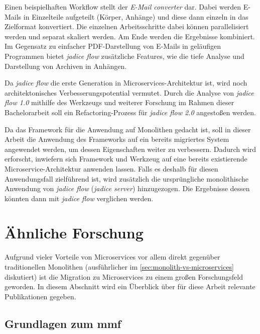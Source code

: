 Einen beispielhaften Workflow stellt der \emph{E-Mail converter} dar.
Dabei werden E-Mails in Einzelteile aufgeteilt (Körper, Anhänge) und diese dann einzeln in das Zielformat konvertiert.
Die einzelnen Arbeitsschritte dabei können parallelisiert werden und separat skaliert werden.
Am Ende werden die Ergebnisse kombiniert.
Im Gegensatz zu einfacher PDF-Darstellung von E-Mails in geläufigen Programmen bietet \emph{jadice flow} zusätzliche Features, wie die tiefe Analyse und Darstellung von Archiven in Anhängen.

Da \emph{jadice flow} die erste Generation in Microservices-Architektur ist, wird noch architektonisches Verbesserungspotential vermutet.
Durch die Analyse von \emph{jadice flow 1.0} mithilfe des Werkzeugs und weiterer Forschung im Rahmen dieser Bachelorarbeit soll ein Refactoring-Prozess für \emph{jadice flow 2.0} angestoßen werden.

Da das Framework für die Anwendung auf Monolithen gedacht ist, soll in dieser Arbeit die Anwendung des Frameworks auf ein bereits migriertes System angewendet werden, um dessen Eigenschaften weiter zu verbessern.
Dadurch wird erforscht, inwiefern sich Framework und Werkzeug auf eine bereits existierende Microservice-Architektur anwenden lassen.
Falls es deshalb für diesen Anwendungsfall zielführend ist, wird zusätzlich die ursprüngliche monolithische Anwendung von \emph{jadice flow} (\emph{jadice server}) hinzugezogen.
Die Ergebnisse dessen könnten dann mit \emph{jadice flow} verglichen werden.

\section{Ähnliche Forschung}

Aufgrund vieler Vorteile von Microservices vor allem direkt gegenüber traditionellen Monolithen (ausführlicher im \cref{sec:monolith-vs-microservices} diskutiert) ist die Migration zu Microservices zu einem großen Forschungsfeld geworden.
In diesem Abschnitt wird ein Überblick über für diese Arbeit relevante Publikationen gegeben.

\subsection{Grundlagen zum \gls{mmf}}

